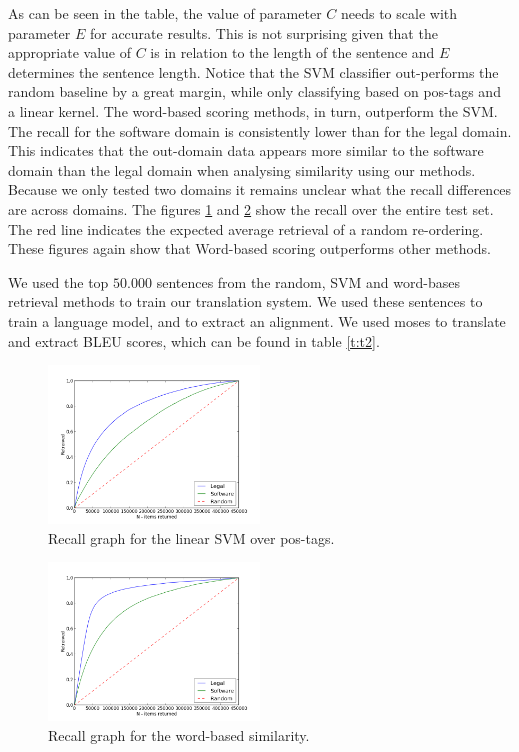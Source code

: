 \documentclass[11pt]{article}
\begin{document}
As can be seen in the table, the value of parameter $C$ needs to scale with parameter $E$ for accurate results. This is not surprising given that the appropriate value of $C$ is in relation to the length of the sentence and $E$ determines the sentence length. Notice that the SVM classifier out-performs the random baseline by a great margin, while only classifying based on pos-tags and a linear kernel. The word-based scoring methods, in turn, outperform the SVM.
The recall for the software domain is consistently lower than for the legal domain. This indicates that the out-domain data appears more similar to the software domain than the legal domain when analysing similarity using our methods. Because we only tested two domains it remains unclear what the recall differences are across domains.
The figures \ref{fig:results1} and \ref{fig:results2} show the recall over the entire test set. The red line indicates the expected average retrieval of a random re-ordering. These figures again show that Word-based scoring outperforms other methods.

We used the top $50.000$ sentences from the random, SVM and word-bases retrieval methods to train our translation system. We used these sentences to train a language model, and to extract an alignment. We used moses to translate and extract BLEU scores, which can be found in table \ref{t:t2}.

\begin{figure}[h]
  \centering
    \includegraphics[width=0.5\textwidth]{SVM}
  \caption{Recall graph for the linear SVM over pos-tags.}
  \label{fig:results1}
\end{figure}

\begin{figure}[H]
  \centering
    \includegraphics[width=0.5\textwidth]{wbs_0_2}
  \caption{Recall graph for the word-based similarity.}
\label{fig:results2}
\end{figure}
\end{document}
